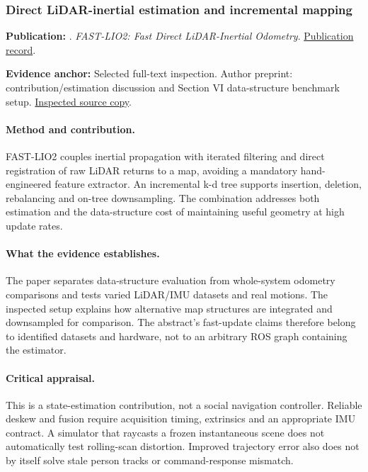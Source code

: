 \subsubsection{Direct LiDAR-inertial estimation and incremental mapping}\label{paper:fastlio}
\textbf{Publication:} \citet{fastlio}. \emph{FAST-LIO2: Fast Direct LiDAR-Inertial Odometry}. \href{https://doi.org/10.1109/tro.2022.3141876}{Publication record}.

\textbf{Evidence anchor:} Selected full-text inspection. Author preprint: contribution/estimation discussion and Section VI data-structure benchmark setup. \href{https://arxiv.org/pdf/2107.06829}{Inspected source copy}.

\paragraph{Method and contribution.} FAST-LIO2 couples inertial propagation with iterated filtering and direct registration of raw LiDAR returns to a map, avoiding a mandatory hand-engineered feature extractor. An incremental k-d tree supports insertion, deletion, rebalancing and on-tree downsampling. The combination addresses both estimation and the data-structure cost of maintaining useful geometry at high update rates.

\paragraph{What the evidence establishes.} The paper separates data-structure evaluation from whole-system odometry comparisons and tests varied LiDAR/IMU datasets and real motions. The inspected setup explains how alternative map structures are integrated and downsampled for comparison. The abstract's fast-update claims therefore belong to identified datasets and hardware, not to an arbitrary ROS graph containing the estimator.

\paragraph{Critical appraisal.} This is a state-estimation contribution, not a social navigation controller. Reliable deskew and fusion require acquisition timing, extrinsics and an appropriate IMU contract. A simulator that raycasts a frozen instantaneous scene does not automatically test rolling-scan distortion. Improved trajectory error also does not by itself solve stale person tracks or command-response mismatch.

